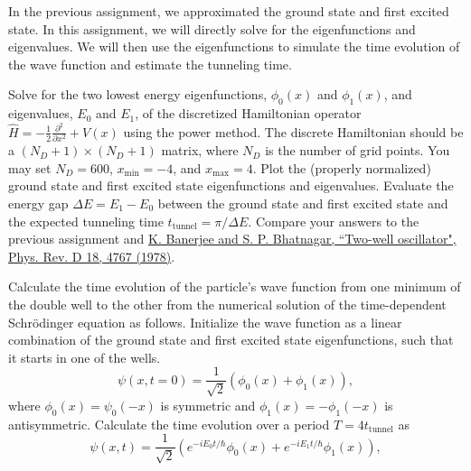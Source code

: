 In the previous assignment, we approximated the ground state and first excited state.
In this assignment, we will directly solve for the eigenfunctions and eigenvalues.
We will then use the eigenfunctions to simulate the time evolution of the wave function and estimate the tunneling time.

\begin{problem}[10]
Solve for the two lowest energy eigenfunctions, $\phi_0(x)$ and $\phi_1(x)$, and eigenvalues, $E_0$ and $E_1$, of the discretized Hamiltonian operator $\hat H = -\frac{1}{2}\frac{\partial^2}{\partial x^2} + V(x)$ using the power method.
The discrete Hamiltonian should be a $(N_D+1)\times(N_D+1)$ matrix, where $N_D$ is the number of grid points.
You may set $N_D=600$, $x_{\min} = -4$, and $x_{\max} = 4$.
Plot the (properly normalized) ground state and first excited state eigenfunctions and eigenvalues.
Evaluate the energy gap $\Delta E = E_1 - E_0$ between the ground state and first excited state and the expected tunneling time $t_\mathrm{tunnel} = \pi/\Delta E$.
Compare your answers to the previous assignment and \href{http://doi.org/10.1103/PhysRevD.18.4767}{K. Banerjee and S. P. Bhatnagar, ``Two-well oscillator", Phys. Rev. D 18, 4767 (1978)}.
\end{problem}

\begin{solution}
\end{solution}

\begin{problem}[10]
Calculate the time evolution of the particle's wave function from one minimum of the double well to the other from the numerical solution of the time-dependent Schr\"{o}dinger equation as follows.
Initialize the wave function as a linear combination of the ground state and first excited state eigenfunctions, such that it starts in one of the wells.
\begin{equation}
  \psi(x, t=0) = \frac{1}{\sqrt{2}}\left ( \phi_0(x) + \phi_1(x)\right ),
\end{equation}
where $\phi_0(x)= \psi_0(-x)$ is symmetric and $\phi_1(x) = -\phi_1(-x)$ is antisymmetric.
Calculate the time evolution over a period $T = 4t_\mathrm{tunnel}$ as
\begin{equation}
  \psi(x, t) = \frac{1}{\sqrt{2}}\left (e^{-iE_0t/\hbar} \phi_0(x) + e^{-iE_1t/\hbar}\phi_1(x)\right ),
\end{equation}
\end{problem}

\begin{solution}
\end{solution}

